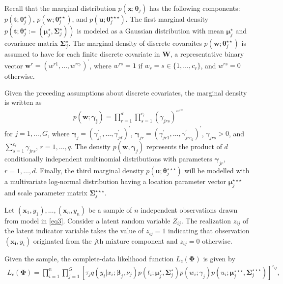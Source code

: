 \documentclass[12pt,letterpaper]{article}
\numberwithin{equation}{section}
\numberwithin{equation}{section}
\numberwithin{equation}{section}
\begin{document}
Recall that the marginal distribution $p(\bm{x}; \bm \theta_j)$ has the following components: $p(\bm{t}; \bm \theta_j^{\star})$, $p(\bm{w}; \bm \theta_j^{\star\star})$, and $p(\bm{u};\bm \theta_{j}^{\star\star\star})$. The first marginal density  $p(\bm{t}; \bm \theta_j^{\star}:=( \bm {\mu}_j^{\star}, \bm{\Sigma}_j^{\star}) )$ is modeled as a  Gaussian distribution with mean $\bm {\mu}_j^{\star}$ and covariance matrix $\bm{\Sigma}_j^{\star}$. 
 The marginal density of discrete covaraites $p(\bm{w};\bm{\theta}_{j}^{\star\star})$ is assumed to have for each finite discrete covariate in $\bm{W}$, a representative binary vector $\bm{w}^r=(w^{r1},\ldots,w^{rc_r})^{'}$, where $w^{rs}=1$ if $w_r = s\in\{1, \ldots, c_r\}$, %
and $w^{rs}=0$ otherwise.

Given the preceding assumptions about discrete covariates, the marginal density is written as
\begin{align}
p(\bm {w}; \bm {\gamma_j})=\prod_{r=1}^{d}\prod_{s=1}^{c_r}(\gamma_{jrs} )^{w^{rs}}
\label{eq31}
\end{align}
for $j=1, \ldots, G$, where $\bm {\gamma}_j=(\gamma_{j1}^{'}, \ldots, \gamma_{jd}^{'})^{'}$, $\bm \gamma_{jr}=(\gamma_{jr1}^{'}, \ldots, \gamma_{jrc_d}^{'})^{'}$, $\gamma_{jrs} > 0$, and  $\sum_{s=1}^{c_r}\gamma_{jrs}$, $r=1,\ldots,q$. The density $p(\bm {w}, \bm{\gamma}_j)$ represents the product of $d$ conditionally independent multinomial distributions with parameters $\bm{\gamma}_{jr}$, $r=1,\ldots, d$. Finally, the third marginal density $p(\bm{u};\bm{\theta}_{j}^{\star\star\star})$ will be modelled with a multivariate log-normal distribution having a location parameter vector $ \bm{\mu}_j^{\star\star\star}$ and scale parameter matrix $\bm{\Sigma}_j^{\star\star\star} $.

Let $(\bm x_1, y_1),\ldots, (\bm x_n, y_n)$ be a sample of $n$ independent observations drawn from model in \eqref{eq3}. Consider a latent random variable $Z_{ij}$.  The realization $z_{ij}$ of the latent indicator variable takes the value of $z_{ij}=1$ indicating that observation $(\bm{x_i}, y_i)$ originated from the $j$th mixture component and $z_{ij}=0$ otherwise.


 Given the sample, the complete-data likelihood function $L_c(\bm\Phi)$ is given by
\begin{align}
L_c(\bm\Phi)=\prod_{i=1}^{n}\prod_{j=1}^{G}\left[{\tau_j}q(y_i|x_i; \bm \beta_j, \nu_{j})p(t_i; \bm\mu_j^{\star}, \bm\Sigma_j^{\star}) p(w_i; \gamma_j)p(u_i; \bm{\mu}_j^{\star\star\star},\bm{\Sigma}_j^{\star\star\star}) \right]^{z_{ij}},
\label{eq27}
\end{align}
\end{document}
